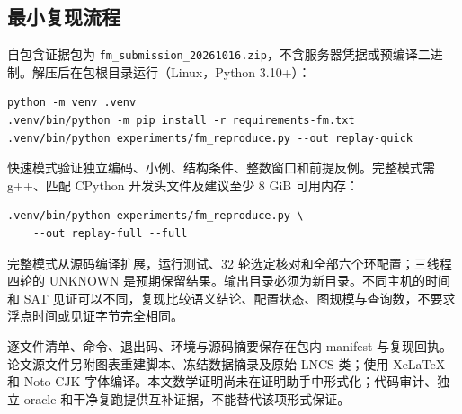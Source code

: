 \subsection{最小复现流程}
自包含证据包为 \texttt{fm\_submission\_20261016.zip}，不含服务器凭据或预编译二进制。解压后在包根目录运行（Linux，Python 3.10+）：
\begin{verbatim}
python -m venv .venv
.venv/bin/python -m pip install -r requirements-fm.txt
.venv/bin/python experiments/fm_reproduce.py --out replay-quick
\end{verbatim}
快速模式验证独立编码、小例、结构条件、整数窗口和前提反例。完整模式需 g++、匹配 CPython 开发头文件及建议至少 8 GiB 可用内存：
\begin{verbatim}
.venv/bin/python experiments/fm_reproduce.py \
    --out replay-full --full
\end{verbatim}
完整模式从源码编译扩展，运行测试、32 轮选定核对和全部六个环配置；三线程四轮的 UNKNOWN 是预期保留结果。输出目录必须为新目录。不同主机的时间和 SAT 见证可以不同，复现比较语义结论、配置状态、图规模与查询数，不要求浮点时间或见证字节完全相同。

逐文件清单、命令、退出码、环境与源码摘要保存在包内 manifest 与复现回执。论文源文件另附图表重建脚本、冻结数据摘录及原始 LNCS 类；使用 XeLaTeX 和 Noto CJK 字体编译。本文数学证明尚未在证明助手中形式化；代码审计、独立 oracle 和干净复跑提供互补证据，不能替代该项形式保证。
